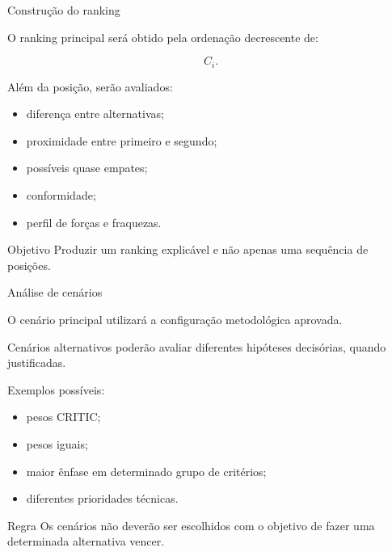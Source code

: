 \begin{frame}{Construção do ranking}

    O ranking principal será obtido pela ordenação decrescente de:

    \[
    C_i.
    \]

    \vspace{0.3cm}

    Além da posição, serão avaliados:

    \begin{itemize}
        \item diferença entre alternativas;
        \item proximidade entre primeiro e segundo;
        \item possíveis quase empates;
        \item conformidade;
        \item perfil de forças e fraquezas.
    \end{itemize}

    \vspace{0.3cm}

    \begin{block}{Objetivo}
        Produzir um ranking explicável e não apenas uma sequência de
        posições.
    \end{block}

\end{frame}



\begin{frame}{Análise de cenários}

    O cenário principal utilizará a configuração metodológica aprovada.

    \vspace{0.3cm}

    Cenários alternativos poderão avaliar diferentes hipóteses
    decisórias, quando justificadas.

    Exemplos possíveis:

    \begin{itemize}
        \item pesos CRITIC;
        \item pesos iguais;
        \item maior ênfase em determinado grupo de critérios;
        \item diferentes prioridades técnicas.
    \end{itemize}

    \vspace{0.3cm}

    \begin{alertblock}{Regra}
        Os cenários não deverão ser escolhidos com o objetivo de fazer
        uma determinada alternativa vencer.
    \end{alertblock}

\end{frame}


